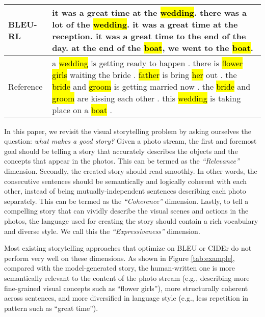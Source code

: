\documentclass[letterpaper]{article} \usepackage{aaai20}  \usepackage{times}  \usepackage{helvet} \usepackage{courier}  \usepackage[hyphens]{url}  \usepackage{graphicx} \urlstyle{rm} \def\UrlFont{\rm}  \usepackage{graphicx}  \frenchspacing  \setlength{\pdfpagewidth}{8.5in}  \setlength{\pdfpageheight}{11in}  \usepackage{times}
\begin{document}
\begin{figure*} 
\centering
{} \\
{\small
\begin{tabular}{|p{}||p{}|}  \hline
BLEU-RL & it was a great time at the \hl{wedding}. there was a lot of the \hl{wedding}. {\color{blue}it was a great time} at the reception. {\color{blue}it was a great time} to the end of the day. at the end of the \hl{boat}, we went to the \hl{boat}. \\ \hline 
Reference & a \hl{wedding} is getting ready to happen . there is \hl{flower girls} waiting the bride . \hl{father} is bring \hl{her} out . the \hl{bride} and \hl{groom} is getting married now . the \hl{bride} and \hl{groom} are kissing each other . this \hl{wedding} is taking place on a \hl{boat} . \\ \hline 
\end{tabular}}
\caption{Comparison between a story generated by the BLEU-RL model that is trained to optimize BLEU and human-written reference. Words in yellow indicate that there are more fine-grained concepts in the human-written reference than the model-generated one. The two segments in blue show an undesired repeating pattern in the output from the model.} \label{tab:example}
\end{figure*}

In this paper, we revisit the visual storytelling problem by asking ourselves the question: \textit{what makes a good story?} Given a photo stream, the first and foremost goal should be telling a story that accurately describes the objects and the concepts that appear in the photos. This can be termed as the \textit{``Relevance''} dimension. Secondly, the created story should read smoothly. In other words, the consecutive sentences should be semantically and logically coherent with each other, instead of being mutually-independent sentences describing each photo separately. This can be termed as the \textit{``Coherence''} dimension. Lastly, to tell a compelling story that can vividly describe the visual scenes and actions in the photos, the language used for creating the story should contain a rich vocabulary and diverse style. We call this the \textit{``Expressiveness''} dimension. 

Most existing storytelling approaches that optimize on BLEU or CIDEr do not perform very well on these dimensions. As shown in Figure \ref{tab:example}, compared with the model-generated story, the human-written one is more semantically relevant to the content of the photo stream (e.g., describing more fine-grained visual concepts such as ``flower girls''), more structurally coherent across sentences, and more diversified in language style (e.g., less repetition in pattern such as ``great time''). 
\end{document}
